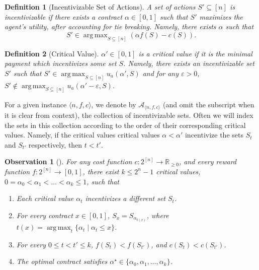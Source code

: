 \documentclass[11pt]{article}
\newtheorem{observation}{Observation}
\newtheorem{definition}{Definition}
\newcommand{\eps}{\varepsilon}
\newcommand{\reals}{\mathbb{R}}
\newcommand{\IS}{\mathcal{A}}
\DeclareMathOperator*{\argmax}{arg\,max}
\newcommand{\instance}{\langle n, f, c \rangle}
\begin{document}
\begin{definition}[Incentivizable Set of Actions]\label{def:incentivizableSets}
    A set of actions $S' \subseteq [n]$ is incentivizable if there exists a contract $\alpha \in [0,1]$ such that $S'$ maximizes the agent's utility, after accounting for tie breaking. Namely, there exists $\alpha$ such that
    $$
    S' \in \argmax_{S \subseteq [n]} \left(\alpha f(S) - c(S)\right).
    $$
\end{definition}

\begin{definition}[Critical Value]\label{def:criticalValue}
    $\alpha' \in [0,1]$ is a critical value if it is the minimal payment which incentivizes some set $S$. Namely, there exists an incentivizable set $S'$ such that
    $S' \in \argmax_{S \subseteq [n]} u_a(\alpha',S)$ and for any $\eps >0$, $S' \notin \argmax_{S \subseteq [n]} u_a(\alpha'-\eps,S)$.
\end{definition}

For a given instance $\instance$, we denote by $\IS_{\instance}$ (and omit the subscript when it is clear from context), the collection of incentivizable sets. Often we will index the sets in this collection according to the order of their corresponding critical values. Namely, if the critical values critical values $\alpha < \alpha'$ incentivize the sets $S_t$ and $S_{t'}$ respectively, then $t < t'$.

\begin{observation} [\cite{dutting2022combinatorial}]\label{obs:critVals}
    For any cost function $c:2^{[n]}\to \reals_{\ge 0}$,
    and every reward function $f:2^{[n]} \to [0,1]$, there exist $k \le 2^n -1$ critical values, $0=\alpha_0 < \alpha_1 < \hdots < \alpha_k \le 1$, such that 
    \begin{enumerate}
        \setlength\itemsep{-0.25em}
        \item Each critical value $\alpha_t$ incentivizes a different set $S_t$.
        \item For every contract $x \in [0,1]$, $S_x = S_{\alpha_{t(x)}}$, where $t(x) = \argmax_{t}\{\alpha_t \mid \alpha_t \le x\}$.
        \item For every $0 \le t < t' \le k$, $f(S_t) < f(S_{t'})$, and $c(S_t) < c(S_{t'})$. 
        \item The optimal contract satisfies $\alpha^\star \in \{\alpha_0,\alpha_1,\ldots,\alpha_k\}$. 
    \end{enumerate}
    \end{observation}
\end{document}
